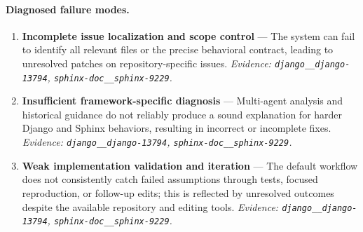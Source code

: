 \paragraph{Diagnosed failure modes.}\begin{enumerate}\itemsep1pt
\item \textbf{Incomplete issue localization and scope control} --- The system can fail to identify all relevant files or the precise behavioral contract, leading to unresolved patches on repository-specific issues. \emph{Evidence: \texttt{django\_\_django-13794}, \texttt{sphinx-doc\_\_sphinx-9229}.}
\item \textbf{Insufficient framework-specific diagnosis} --- Multi-agent analysis and historical guidance do not reliably produce a sound explanation for harder Django and Sphinx behaviors, resulting in incorrect or incomplete fixes. \emph{Evidence: \texttt{django\_\_django-13794}, \texttt{sphinx-doc\_\_sphinx-9229}.}
\item \textbf{Weak implementation validation and iteration} --- The default workflow does not consistently catch failed assumptions through tests, focused reproduction, or follow-up edits; this is reflected by unresolved outcomes despite the available repository and editing tools. \emph{Evidence: \texttt{django\_\_django-13794}, \texttt{sphinx-doc\_\_sphinx-9229}.}
\end{enumerate}
